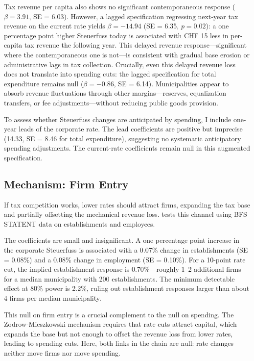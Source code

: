 \documentclass[12pt]{article}
\begin{document}
Tax revenue per capita also shows no significant contemporaneous response ($\beta = 3.91$, SE = 6.03). However, a lagged specification regressing next-year tax revenue on the current rate yields $\beta = -14.94$ (SE = 6.35, $p = 0.02$): a one percentage point higher Steuerfuss today is associated with CHF 15 less in per-capita tax revenue the following year. This delayed revenue response---significant where the contemporaneous one is not---is consistent with gradual base erosion or administrative lags in tax collection. Crucially, even this delayed revenue loss does not translate into spending cuts: the lagged specification for total expenditure remains null ($\beta = -0.86$, SE = 6.14). Municipalities appear to absorb revenue fluctuations through other margins---reserves, equalization transfers, or fee adjustments---without reducing public goods provision.

To assess whether Steuerfuss changes are anticipated by spending, I include one-year leads of the corporate rate. The lead coefficients are positive but imprecise (14.33, SE = 8.46 for total expenditure), suggesting no systematic anticipatory spending adjustments. The current-rate coefficients remain null in this augmented specification.




\subsection{Mechanism: Firm Entry}

If tax competition works, lower rates should attract firms, expanding the tax base and partially offsetting the mechanical revenue loss.  tests this channel using BFS STATENT data on establishments and employees.

The coefficients are small and insignificant. A one percentage point increase in the corporate Steuerfuss is associated with a 0.07\% change in establishments (SE = 0.08\%) and a 0.08\% change in employment (SE = 0.10\%). For a 10-point rate cut, the implied establishment response is 0.70\%---roughly 1--2 additional firms for a median municipality with 200 establishments. The minimum detectable effect at 80\% power is 2.2\%, ruling out establishment responses larger than about 4 firms per median municipality.

This null on firm entry is a crucial complement to the null on spending. The Zodrow-Mieszkowski mechanism requires that rate cuts attract capital, which expands the base but not enough to offset the revenue loss from lower rates, leading to spending cuts. Here, both links in the chain are null: rate changes neither move firms nor move spending.
\end{document}

